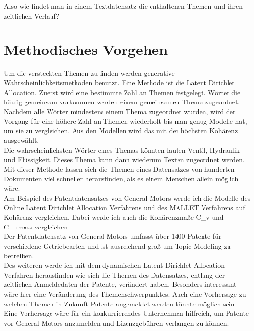Also wie findet man in einem Textdatensatz die enthaltenen Themen und ihren zeitlichen Verlauf?\\

\section{Methodisches Vorgehen}
Um die versteckten Themen zu finden werden generative Wahrscheinlichkeitsmethoden benutzt. Eine Methode ist die Latent Dirichlet Allocation. \parencite[vgl.][]{Blei03latentdirichlet} Zuerst wird eine bestimmte Zahl an Themen festgelegt. Wörter die häufig gemeinsam vorkommen werden einem gemeinsamen Thema zugeordnet. Nachdem alle Wörter mindestens einem Thema zugeordnet wurden, wird der Vorgang für eine höhere Zahl an Themen wiederholt bis man genug Modelle hat, um sie zu vergleichen. Aus den Modellen wird das mit der höchsten Kohärenz ausgewählt. \parencite[vgl.][]{TopicCoherence}\\

Die wahrscheinlichsten Wörter eines Themas könnten lauten Ventil, Hydraulik und Flüssigkeit. Dieses Thema kann dann wiederum Texten zugeordnet werden. Mit dieser Methode lassen sich die Themen eines Datensatzes von hunderten Dokumenten viel schneller herausfinden, als es einem Menschen allein möglich wäre.\\

Am Beispiel des Patentdatensatzes von General Motors werde ich die Modelle des Online Latent Dirichlet Allocation Verfahrens \parencite[vgl.][]{Hoffman10onlinelearning} und des MALLET Verfahrens \parencite[vgl.][]{McCallumMALLET} auf Kohärenz vergleichen. Dabei werde ich auch die Kohärenzmaße C\_v und C\_umass vergleichen. \parencite[vgl.][]{TopicCoherence}\\

Der Patentdatensatz von General Motors umfasst über 1400 Patente für verschiedene Getriebearten und ist ausreichend groß um Topic Modeling zu betreiben.\\

Des weiteren werde ich mit dem dynamischen Latent Dirichlet Allocation Verfahren herausfinden wie sich die Themen des Datensatzes, entlang der zeitlichen Anmeldedaten der Patente, verändert haben. \parencite[vgl.][]{dynamicLDA} Besonders interessant wäre hier eine Veränderung des Themenschwerpunktes. Auch eine Vorhersage zu welchen Themen in Zukunft Patente angemeldet werden könnte möglich sein. Eine Vorhersage wäre für ein konkurrierendes Unternehmen hilfreich, um Patente vor General Motors anzumelden und Lizenzgebühren verlangen zu können.\\

